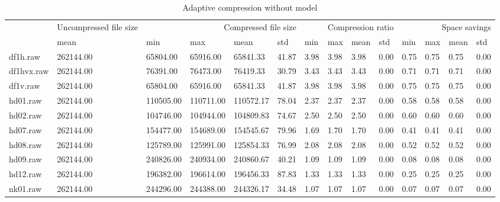 \begin{table}
\caption{Adaptive compression without model}
\begin{tabular}{llllllllllllll}
 & Uncompressed file size & \multicolumn{4}{r}{Compressed file size} & \multicolumn{4}{r}{Compression ratio} & \multicolumn{4}{r}{Space savings} \\
 & mean & min & max & mean & std & min & max & mean & std & min & max & mean & std \\
df1h.raw & 262144.00 & 65804.00 & 65916.00 & 65841.33 & 41.87 & 3.98 & 3.98 & 3.98 & 0.00 & 0.75 & 0.75 & 0.75 & 0.00 \\
df1hvx.raw & 262144.00 & 76391.00 & 76473.00 & 76419.33 & 30.79 & 3.43 & 3.43 & 3.43 & 0.00 & 0.71 & 0.71 & 0.71 & 0.00 \\
df1v.raw & 262144.00 & 65804.00 & 65916.00 & 65841.33 & 41.87 & 3.98 & 3.98 & 3.98 & 0.00 & 0.75 & 0.75 & 0.75 & 0.00 \\
hd01.raw & 262144.00 & 110505.00 & 110711.00 & 110572.17 & 78.04 & 2.37 & 2.37 & 2.37 & 0.00 & 0.58 & 0.58 & 0.58 & 0.00 \\
hd02.raw & 262144.00 & 104746.00 & 104944.00 & 104809.83 & 74.67 & 2.50 & 2.50 & 2.50 & 0.00 & 0.60 & 0.60 & 0.60 & 0.00 \\
hd07.raw & 262144.00 & 154477.00 & 154689.00 & 154545.67 & 79.96 & 1.69 & 1.70 & 1.70 & 0.00 & 0.41 & 0.41 & 0.41 & 0.00 \\
hd08.raw & 262144.00 & 125789.00 & 125991.00 & 125854.33 & 76.99 & 2.08 & 2.08 & 2.08 & 0.00 & 0.52 & 0.52 & 0.52 & 0.00 \\
hd09.raw & 262144.00 & 240826.00 & 240934.00 & 240860.67 & 40.21 & 1.09 & 1.09 & 1.09 & 0.00 & 0.08 & 0.08 & 0.08 & 0.00 \\
hd12.raw & 262144.00 & 196382.00 & 196614.00 & 196456.33 & 87.83 & 1.33 & 1.33 & 1.33 & 0.00 & 0.25 & 0.25 & 0.25 & 0.00 \\
nk01.raw & 262144.00 & 244296.00 & 244388.00 & 244326.17 & 34.48 & 1.07 & 1.07 & 1.07 & 0.00 & 0.07 & 0.07 & 0.07 & 0.00 \\
\end{tabular}
\end{table}

